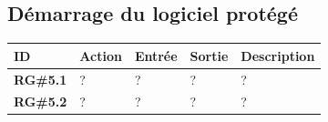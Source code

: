 \newpage
\subsection{Démarrage du logiciel protégé}

\begin{table}[!h] %
    \small
    \begin{tabular}{|m{1.5cm}|m{1.9cm}|m{2.5cm}|m{2.5cm}|m{7cm}|} 
	\hline
	    \textbf{ID} & \textbf{Action} & \textbf{Entrée} & \textbf{Sortie} & \textbf{Description} \\
	\hline
	    \textbf{RG\#5.1} & ? & ? & ? & ? \\
    \hline
	    \textbf{RG\#5.2} & ? & ? & ? & ? \\
	\hline
    \end{tabular}
\end{table}
